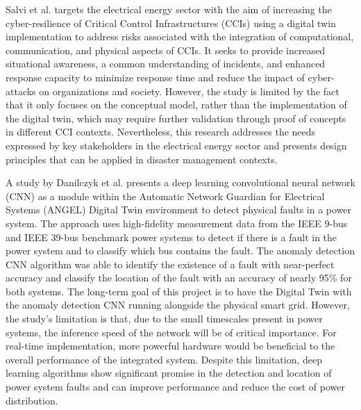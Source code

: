 Salvi et al.\cite{salviCyberresilienceCriticalCyber2022} targets the electrical energy sector with the aim of increasing the cyber-resilience of Critical Control Infrastructures (CCIs) using a digital twin implementation to address risks associated with the integration of computational, communication, and physical aspects of CCIs. It seeks to provide increased situational awareness, a common understanding of incidents, and enhanced response capacity to minimize response time and reduce the impact of cyber-attacks on organizations and society. However, the study is limited by the fact that it only focuses on the conceptual model, rather than the implementation of the digital twin, which may require further validation through proof of concepts in different CCI contexts. Nevertheless, this research addresses the needs expressed by key stakeholders in the electrical energy sector and presents design principles that can be applied in disaster management contexts.


A study by Danilczyk et al.\cite{danilczykSmartGridAnomaly2021} presents a deep learning convolutional neural network (CNN) as a module within the Automatic Network Guardian for Electrical Systems (ANGEL) Digital Twin environment to detect physical faults in a power system. The approach uses high-fidelity measurement data from the IEEE 9-bus and IEEE 39-bus benchmark power systems to detect if there is a fault in the power system and to classify which bus contains the fault. The anomaly detection CNN algorithm was able to identify the existence of a fault with near-perfect accuracy and classify the location of the fault with an accuracy of nearly 95\% for both systems. The long-term goal of this project is to have the Digital Twin with the anomaly detection CNN running alongside the physical smart grid. However, the study's limitation is that, due to the small timescales present in power systems, the inference speed of the network will be of critical importance. For real-time implementation, more powerful hardware would be beneficial to the overall performance of the integrated system. Despite this limitation, deep learning algorithms show significant promise in the detection and location of power system faults and can improve performance and reduce the cost of power distribution.


